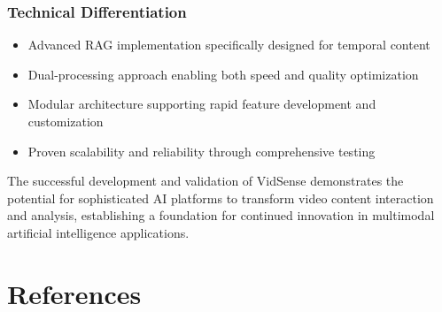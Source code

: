 \documentclass{bscs}
\begin{document}
\subsection{Technical Differentiation}

\begin{itemize}
\item Advanced RAG implementation specifically designed for temporal content
\item Dual-processing approach enabling both speed and quality optimization
\item Modular architecture supporting rapid feature development and customization
\item Proven scalability and reliability through comprehensive testing
\end{itemize}

The successful development and validation of VidSense demonstrates the potential for sophisticated AI platforms to transform video content interaction and analysis, establishing a foundation for continued innovation in multimodal artificial intelligence applications.

\chapter{References}
\end{document}
